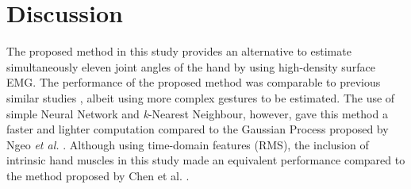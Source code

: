 \documentclass[conference]{IEEEtran}
\begin{document}
\section{Discussion}
The proposed method in this study provides an alternative to estimate simultaneously eleven joint 
angles of the hand by using high-density surface EMG. The performance of the proposed method was 
comparable to previous similar studies \cite{b16}\cite{b19}\cite{b20}, albeit using more complex gestures to be estimated. 
The use of simple Neural Network and \textit{k}-Nearest Neighbour, however, gave this method a faster and lighter 
computation compared to the Gaussian Process proposed by Ngeo \textit{et al.} \cite{b16}. Although using time-domain 
features (RMS), the inclusion of intrinsic hand muscles in this study made an equivalent performance 
compared to the method proposed by Chen et al. \cite{b19}.
\end{document}
